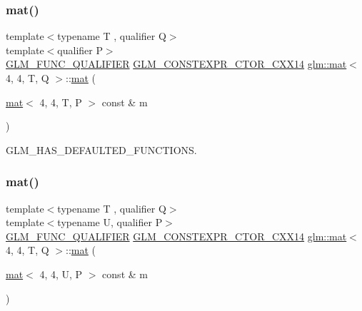 \mbox{\label{structglm_1_1mat_3_014_00_014_00_01_t_00_01_q_01_4_a201642febedfc558e98f60763db82ee4}} 
\subsubsection{\texorpdfstring{mat()}{mat()}\hspace{0.1cm}{\footnotesize\ttfamily [18/21]}}
{\footnotesize\ttfamily template$<$typename T , qualifier Q$>$ \\
template$<$qualifier P$>$ \\
\hyperlink{setup_8hpp_a33fdea6f91c5f834105f7415e2a64407}{G\+L\+M\+\_\+\+F\+U\+N\+C\+\_\+\+Q\+U\+A\+L\+I\+F\+I\+ER} \hyperlink{setup_8hpp_a0900f9145e68bf6061b6f5e7be3fa751}{G\+L\+M\+\_\+\+C\+O\+N\+S\+T\+E\+X\+P\+R\+\_\+\+C\+T\+O\+R\+\_\+\+C\+X\+X14} \hyperlink{structglm_1_1mat}{glm\+::mat}$<$ 4, 4, T, Q $>$\+::\hyperlink{structglm_1_1mat}{mat} (\begin{DoxyParamCaption}\item[{\hyperlink{structglm_1_1mat}{mat}$<$ 4, 4, T, P $>$ const \&}]{m }\end{DoxyParamCaption})}



G\+L\+M\+\_\+\+H\+A\+S\+\_\+\+D\+E\+F\+A\+U\+L\+T\+E\+D\+\_\+\+F\+U\+N\+C\+T\+I\+O\+NS. 

\mbox{\label{structglm_1_1mat_3_014_00_014_00_01_t_00_01_q_01_4_ad2beaa9b97c574cef34b46ee73c86501}} 
\subsubsection{\texorpdfstring{mat()}{mat()}\hspace{0.1cm}{\footnotesize\ttfamily [19/21]}}
{\footnotesize\ttfamily template$<$typename T , qualifier Q$>$ \\
template$<$typename U, qualifier P$>$ \\
\hyperlink{setup_8hpp_a33fdea6f91c5f834105f7415e2a64407}{G\+L\+M\+\_\+\+F\+U\+N\+C\+\_\+\+Q\+U\+A\+L\+I\+F\+I\+ER} \hyperlink{setup_8hpp_a0900f9145e68bf6061b6f5e7be3fa751}{G\+L\+M\+\_\+\+C\+O\+N\+S\+T\+E\+X\+P\+R\+\_\+\+C\+T\+O\+R\+\_\+\+C\+X\+X14} \hyperlink{structglm_1_1mat}{glm\+::mat}$<$ 4, 4, T, Q $>$\+::\hyperlink{structglm_1_1mat}{mat} (\begin{DoxyParamCaption}\item[{\hyperlink{structglm_1_1mat}{mat}$<$ 4, 4, U, P $>$ const \&}]{m }\end{DoxyParamCaption})}


